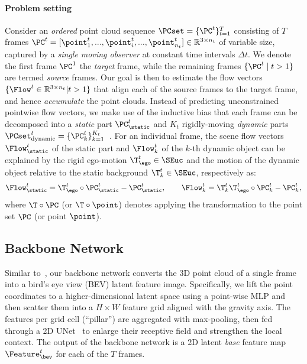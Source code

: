 \paragraph{Problem setting}
Consider an \textit{ordered} point cloud sequence $\PCset = \{\PC^t\}_{t=1}^T$ consisting of $T$ frames $\PC^t = [\point_1^t,...,\point_i^t,...,\point_{n_t}^t] \in \mathbb{R}^{3 \times n_t}$ of variable size, captured by a \textit{single moving observer} at constant time intervals $\Delta t$. We denote the first frame $\PC^1$ the \textit{target} frame, while the remaining frames $\{ \PC^{t} \; | \; t>1 \}$ are termed \textit{source} frames. Our goal is then to estimate the flow vectors $\{ \Flow^t \in \mathbb{R}^{3 \times n_t} | t>1 \}$ that align each of the source frames to the target frame, and hence \emph{accumulate} the point clouds. Instead of predicting unconstrained pointwise flow vectors, we make use of the inductive bias that each frame can be decomposed into a %
\textit{static} part $\PC^t_\static$ and $K_{t}$ rigidly-moving \textit{dynamic} parts $\PCset^t_{\text{dynamic}} = \{\PC^t_k\}_{k=1}^{K_t}$~\cite{gojcic2021weakly}. 
For an individual frame, the scene flow vectors $\Flow_\static^t$ of the static part and $\Flow_k^t$ of the $k$-th dynamic object can be explained by the rigid %
ego-motion
$\T_\ego^t \in \SEuc$ and the motion of the dynamic object relative to the static background $\T_k^t \in \SEuc$, respectively as:
\begin{equation}
\label{eq:sf}
    \Flow_\static^t = \T_\ego^t \circ \PC_\static^t - \PC_\static^t, \qquad
    \Flow_k^t = \T_k^t \T_\ego^t \circ \PC_k^t - \PC_k^t,
\end{equation}
where $\T\circ\PC$ (or $\T \circ \point$) denotes applying the transformation to the point set $\PC$ (or point $\point$).

\subsection{Backbone Network}
\label{sec:backbone_network}
Similar to~\cite{baur2021slim,jund2021scalable,wu2020motionnet}, our backbone network converts the 3D point cloud of a single frame into a bird's eye view (BEV) 
latent feature image. Specifically, we lift the point coordinates to a higher-dimensional latent space using a point-wise MLP and then scatter them into a $H\times W$ feature grid aligned with the gravity axis. The features per grid cell (``pillar'') are aggregated with max-pooling, then fed through a 2D UNet~\cite{long2015fully} to enlarge their receptive field and strengthen the local context. The output of the backbone network is a 2D latent \emph{base} feature map $\Feature_\bev^t$ for each of the $T$ frames.

